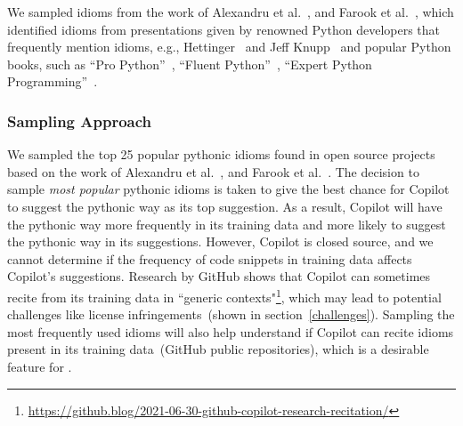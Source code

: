 We sampled idioms from the work of Alexandru et al.~\cite{Alexandru2018}, and Farook et al.~\cite{idioms}, which identified idioms from presentations given by renowned Python developers that frequently mention idioms, e.g., Hettinger~\cite{hettinger} and Jeff Knupp~\cite{knupp} and 
popular Python books, such as ``Pro Python''~\cite{Alchin2010}, ``Fluent Python''~\cite{fluent}, ``Expert Python Programming''~\cite{expert}.


\subsubsection{Sampling Approach}
\label{sampling}
We sampled the top 25 popular pythonic idioms found in open source projects based on the work of Alexandru et al.~\cite{Alexandru2018}, and Farook et al.~\cite{idioms}.
The decision to sample \emph{most popular} pythonic idioms is taken to give the best chance for Copilot to suggest the pythonic way as its top suggestion. As a result, Copilot will have the pythonic way more frequently in its training data and more likely to suggest the pythonic way in its suggestions.
However, Copilot is closed source, and we cannot determine if the frequency of code snippets in training data affects Copilot's suggestions. Research by GitHub shows that Copilot can sometimes recite from its training data in ``generic contexts"\footnote{\url{https://github.blog/2021-06-30-github-copilot-research-recitation/}}, which may lead to potential challenges like license infringements~(shown in section~\ref{challenges}). 
Sampling the most frequently used idioms will also help understand if Copilot can recite idioms present in its training data~(GitHub public repositories), which is a desirable feature for \cct{}.
